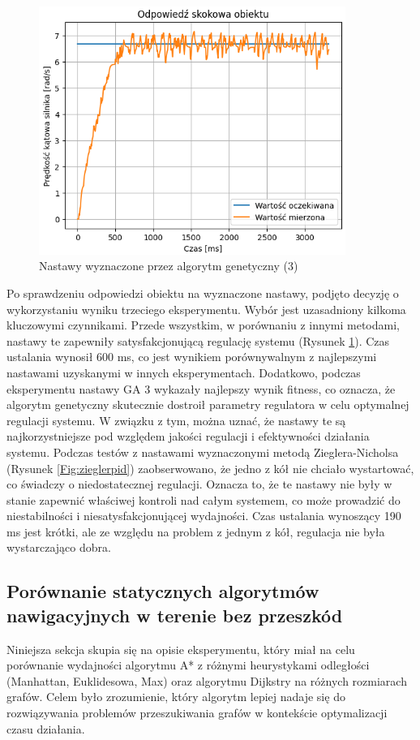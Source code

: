 \documentclass[12pt,twoside]{article}
\begin{document}
\begin{figure}[ht]%
 \centering%
 \includegraphics[width=10cm]{figures/PID/exp3pid.png}%
 \caption{Nastawy wyznaczone przez algorytm genetyczny (3)}%
 \label{Fig:exp3pid}%
\end{figure}

\clearpage

Po sprawdzeniu odpowiedzi obiektu na wyznaczone nastawy, podjęto decyzję o wykorzystaniu wyniku trzeciego eksperymentu. Wybór jest uzasadniony kilkoma kluczowymi czynnikami. Przede wszystkim, w porównaniu z innymi metodami, nastawy te zapewniły satysfakcjonującą regulację systemu (Rysunek \ref{Fig:exp3pid}). Czas ustalania wynosił 600 ms, co jest wynikiem porównywalnym z najlepszymi nastawami uzyskanymi w innych eksperymentach. Dodatkowo, podczas eksperymentu nastawy GA 3 wykazały najlepszy wynik fitness, co oznacza, że algorytm genetyczny skutecznie dostroił parametry regulatora w celu optymalnej regulacji systemu. W związku z tym, można uznać, że nastawy te są najkorzystniejsze pod względem jakości regulacji i efektywności działania systemu. Podczas testów z nastawami wyznaczonymi metodą Zieglera-Nicholsa (Rysunek \ref{Fig:zieglerpid}) zaobserwowano, że jedno z kół nie chciało wystartować, co świadczy o niedostatecznej regulacji. Oznacza to, że te nastawy nie były w stanie zapewnić właściwej kontroli nad całym systemem, co może prowadzić do niestabilności i niesatysfakcjonującej wydajności. Czas ustalania wynoszący 190 ms jest krótki, ale ze względu na problem z jednym z kół, regulacja nie była wystarczająco dobra.



\subsection{Porównanie statycznych algorytmów nawigacyjnych w terenie bez przeszkód}
Niniejsza sekcja skupia się na opisie eksperymentu, który miał na celu porównanie wydajności algorytmu A* z różnymi heurystykami odległości (Manhattan, Euklidesowa, Max) oraz algorytmu Dijkstry na różnych rozmiarach grafów. Celem było zrozumienie, który algorytm lepiej nadaje się do rozwiązywania problemów przeszukiwania grafów w kontekście optymalizacji czasu działania. 
\end{document}
